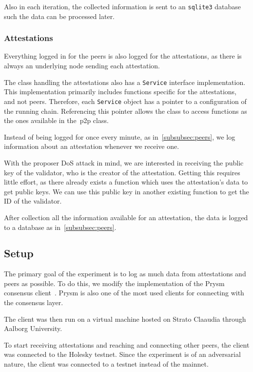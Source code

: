 Also in each iteration,
the collected information is sent to an \texttt{sqlite3} database such the data can be processed later.

\subsubsection{Attestations}\label{subsubsec:attestations}
Everything logged in for the peers is also logged for the attestations,
as there is always an underlying node sending each attestation.

The class handling the attestations also has a \texttt{Service} interface implementation.
This implementation primarily includes functions specific for the attestations, and not peers.
Therefore, each \texttt{Service} object has a pointer to a configuration of the running chain.
Referencing this pointer allows the class to access functions as the ones available in the~\gls{p2p} class.

Instead of being logged for once every minute, as in~\autoref{subsubsec:peers},
we log information about an attestation whenever we receive one.

With the proposer DoS attack in mind, we are interested in receiving the public key of the validator,
who is the creator of the attestation.
Getting this requires little effort,
as there already exists a function which uses the attestation's data to get public keys.
We can use this public key in another existing function to get the ID of the validator.

After collection all the information available for an attestation,
the data is logged to a database as in~\autoref{subsubsec:peers}.

\subsection{Setup}\label{subsec:setup}
The primary goal of the experiment is to log as much data from attestations and peers as possible.
To do this, we modify the implementation of the Prysm consensus client~\cite{prysm}.
Prysm is also one of the most used clients for connecting with the consensus layer.

The client was then run on a virtual machine hosted on Strato Claaudia through Aalborg University.



To start receiving attestations and reaching and connecting other peers,
the client was connected to the Holesky testnet.
Since the experiment is of an adversarial nature, the client was connected to a testnet instead of the mainnet.

